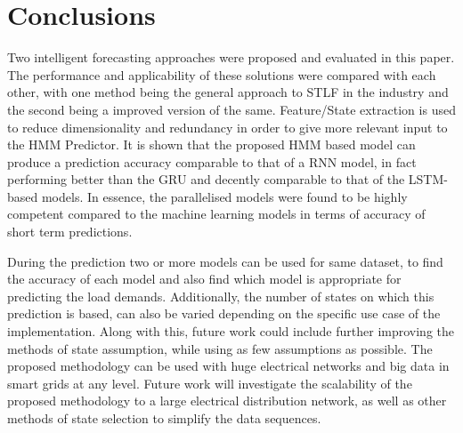\documentclass[conference]{IEEEtran}
\begin{document}
\section{Conclusions}

Two intelligent forecasting approaches were proposed and evaluated in this paper. The performance and applicability of these solutions were compared with each other, with one method being the general approach to STLF in the industry and the second being a improved version of the same. Feature/State extraction is used to reduce dimensionality and redundancy in order to give more relevant input to the HMM Predictor. It is shown that the proposed HMM based model can produce a prediction accuracy comparable to that of a RNN model, in fact performing better than the GRU and decently comparable to that of the LSTM-based models. In essence, the parallelised models were found to be highly competent compared to the machine learning models in terms of accuracy of short term predictions.

During the prediction two or more models can be used for same dataset, to find the accuracy of each model and also find which model is appropriate for predicting the load demands. Additionally, the number of states on which this prediction is based, can also be varied depending on the specific use case of the implementation. Along with this, future work could include further improving the methods of state assumption, while using as few assumptions as possible. The proposed methodology can be used with huge electrical networks and big data in smart grids at any level. Future work will investigate the scalability of the proposed methodology to a large electrical distribution network, as well as other methods of state selection to simplify the data sequences.


\vspace{12pt}
\end{document}
